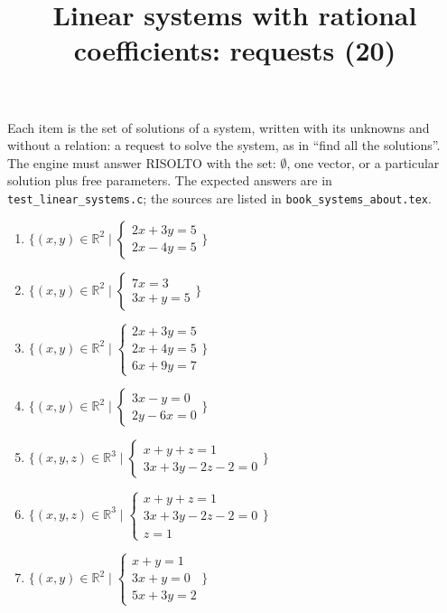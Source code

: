 \documentclass[11pt,a4paper]{article}
\title{Linear systems with rational coefficients: requests (20)}
\author{}
\date{}
\begin{document}
\maketitle
Each item is the set of solutions of a system, written with its unknowns and without a relation: a request to solve the system, as in ``find all the solutions''. The engine must answer RISOLTO with the set: $\emptyset$, one vector, or a particular solution plus free parameters. The expected answers are in \texttt{test\_linear\_systems.c}; the sources are listed in \texttt{book\_systems\_about.tex}.

\begin{enumerate}
\item $\displaystyle \{(x, y) \in \mathbb{R}^{2} \mid \begin{cases} 2x + 3y = 5 \\ 2x - 4y = 5 \end{cases}\}$
\item $\displaystyle \{(x, y) \in \mathbb{R}^{2} \mid \begin{cases} 7x = 3 \\ 3x + y = 5 \end{cases}\}$
\item $\displaystyle \{(x, y) \in \mathbb{R}^{2} \mid \begin{cases} 2x + 3y = 5 \\ 2x + 4y = 5 \\ 6x + 9y = 7 \end{cases}\}$
\item $\displaystyle \{(x, y) \in \mathbb{R}^{2} \mid \begin{cases} 3x - y = 0 \\ 2y - 6x = 0 \end{cases}\}$
\item $\displaystyle \{(x, y, z) \in \mathbb{R}^{3} \mid \begin{cases} x + y + z = 1 \\ 3x + 3y - 2z - 2 = 0 \end{cases}\}$
\item $\displaystyle \{(x, y, z) \in \mathbb{R}^{3} \mid \begin{cases} x + y + z = 1 \\ 3x + 3y - 2z - 2 = 0 \\ z = 1 \end{cases}\}$
\item $\displaystyle \{(x, y) \in \mathbb{R}^{2} \mid \begin{cases} x + y = 1 \\ 3x + y = 0 \\ 5x + 3y = 2 \end{cases}\}$

\end{enumerate}
\end{document}
